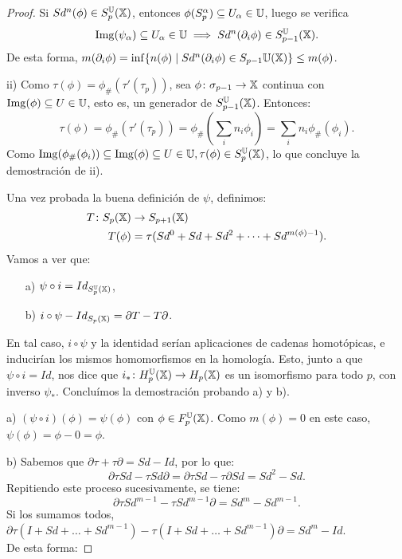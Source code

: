 \begin{proof}
  Si $Sd^n(\phi) \in S_p^{\mathbb U}({\mathbb X})$, entonces $\phi(S_p^\alpha) \subseteq U_\alpha \in {\mathbb U}$, luego se verifica
  \[ \operatorname{Img}(\psi_\alpha) \subseteq U_\alpha \in {\mathbb U} \implies Sd^n(\partial_i \phi) \in S_{p-1}^{\mathbb U}({\mathbb X}). \]
  De esta forma, $m(\partial_i \phi) = \inf\{n(\phi) \mid Sd^n(\partial_i \phi) \in S_{p-1}{\mathbb U}({\mathbb X})\} \leq m(\phi)$.

  ii) Como $\tau(\phi) = \phi_\# (\tau'(\tau_p))$, sea $\phi \colon \sigma_{p-1} \to {\mathbb X}$ continua con $\operatorname{Img}(\phi) \subseteq U \in {\mathbb U}$, esto es,
  un generador de $S_{p-1}^{\mathbb U}({\mathbb X})$. Entonces:
  \[ \tau(\phi) = \phi_\#(\tau'(\tau_p)) = \phi_\#(\sum_i n_i \phi_i) = \sum_i n_i \phi_\#(\phi_i). \]
  Como $\operatorname{Img}(\phi_\#(\phi_i)) \subseteq \operatorname{Img}(\phi) \subseteq U \in {\mathbb U}, \tau(\phi) \in S_p^{\mathbb U}({\mathbb X})$, lo que concluye la demostración de ii).

  Una vez probada la buena definición de $\psi$, definimos:
  \begin{align*}
    T \colon S_p({\mathbb X}) &\to S_{p+1}({\mathbb X})  \\
    T(\phi) &= \tau(Sd^0 + Sd + Sd^2 + \dots + Sd^{m(\phi) - 1}).
  \end{align*}
  Vamos a ver que:
  \begin{itemize}
    \item[a)] $\psi \circ i = Id_{S_p^{\mathbb U}({\mathbb X})}$,
    \item[b)] $i \circ \psi - Id_{S_{p}({\mathbb X})} = \partial T - T \partial$.
  \end{itemize}
  En tal caso, $i \circ \psi$ y la identidad serían aplicaciones de cadenas homotópicas, e inducirían los mismos homomorfismos en la homología.
  Esto, junto a que $\psi \circ i = Id$, nos dice que $i_* \colon H_p^{{\mathbb U}}({\mathbb X}) \to H_p({\mathbb X})$ es un isomorfismo para todo $p$, con inverso $\psi_*$.
  Concluímos la demostración probando a) y b).

  a) $(\psi \circ i)(\phi) = \psi(\phi)$ con $\phi \in F_p^{\mathbb U}({\mathbb X})$. Como $m(\phi) = 0$ en este caso, $\psi(\phi) = \phi - 0 = \phi$.

  b) Sabemos que $\partial \tau + \tau \partial = Sd - Id$, por lo que:
  \[ \partial \tau Sd - \tau Sd \partial = \partial \tau Sd - \tau \partial Sd = Sd^2 - Sd. \]
  Repitiendo este proceso sucesivamente, se tiene:
  \[ \partial \tau Sd^{m - 1} - \tau Sd^{m-1} \partial = Sd^m - Sd^{m-1}. \]
  Si los sumamos todos, $\partial \tau(I + Sd + \dots + Sd^{m-1}) - \tau(I + Sd + \dots + Sd^{m-1}) \partial = Sd^m - Id$. \\
  De esta forma:


\end{proof}
